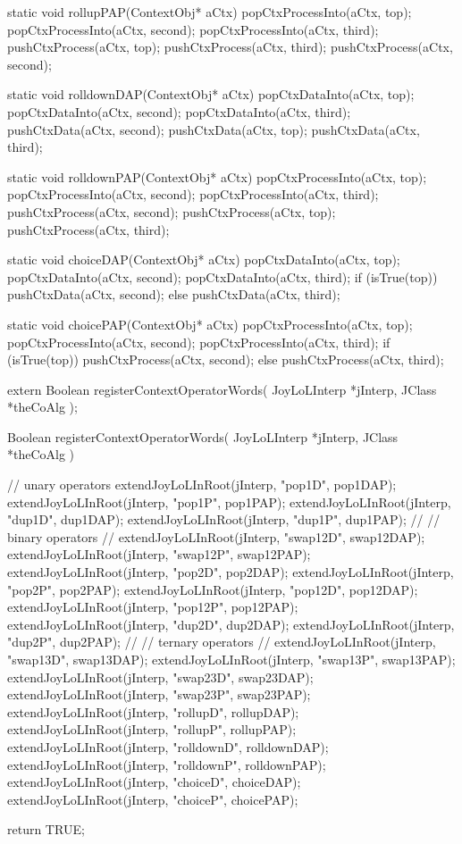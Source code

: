\startCCode
static void rollupPAP(ContextObj* aCtx) {
  popCtxProcessInto(aCtx, top);
  popCtxProcessInto(aCtx, second);
  popCtxProcessInto(aCtx, third);
  pushCtxProcess(aCtx, top);
  pushCtxProcess(aCtx, third);
  pushCtxProcess(aCtx, second);
}
\stopCCode

\startCCode
static void rolldownDAP(ContextObj* aCtx) {
  popCtxDataInto(aCtx, top);
  popCtxDataInto(aCtx, second);
  popCtxDataInto(aCtx, third);
  pushCtxData(aCtx, second);
  pushCtxData(aCtx, top);
  pushCtxData(aCtx, third);
}
\stopCCode

\startCCode
static void rolldownPAP(ContextObj* aCtx) {
  popCtxProcessInto(aCtx, top);
  popCtxProcessInto(aCtx, second);
  popCtxProcessInto(aCtx, third);
  pushCtxProcess(aCtx, second);
  pushCtxProcess(aCtx, top);
  pushCtxProcess(aCtx, third);
}
\stopCCode

\startCCode
static void choiceDAP(ContextObj* aCtx) {
  popCtxDataInto(aCtx, top);
  popCtxDataInto(aCtx, second);
  popCtxDataInto(aCtx, third);
  if (isTrue(top)) {
    pushCtxData(aCtx, second);
  } else {
    pushCtxData(aCtx, third);
  }
}
\stopCCode

\startCCode
static void choicePAP(ContextObj* aCtx) {
  popCtxProcessInto(aCtx, top);
  popCtxProcessInto(aCtx, second);
  popCtxProcessInto(aCtx, third);
  if (isTrue(top)) {
    pushCtxProcess(aCtx, second);
  } else {
    pushCtxProcess(aCtx, third);
  }
}
\stopCCode


\startCHeader
extern Boolean registerContextOperatorWords(
  JoyLoLInterp *jInterp,
  JClass       *theCoAlg
);
\stopCHeader
{}

\startCCode
Boolean registerContextOperatorWords(
  JoyLoLInterp *jInterp,
  JClass       *theCoAlg
) {
  // unary operators
  extendJoyLoLInRoot(jInterp, "pop1D", pop1DAP);
  extendJoyLoLInRoot(jInterp, "pop1P", pop1PAP);
  extendJoyLoLInRoot(jInterp, "dup1D", dup1DAP);
  extendJoyLoLInRoot(jInterp, "dup1P", dup1PAP);
  //
  // binary operators
  //
  extendJoyLoLInRoot(jInterp, "swap12D", swap12DAP);
  extendJoyLoLInRoot(jInterp, "swap12P", swap12PAP);
  extendJoyLoLInRoot(jInterp, "pop2D",   pop2DAP);
  extendJoyLoLInRoot(jInterp, "pop2P",   pop2PAP);
  extendJoyLoLInRoot(jInterp, "pop12D",  pop12DAP);
  extendJoyLoLInRoot(jInterp, "pop12P",  pop12PAP);
  extendJoyLoLInRoot(jInterp, "dup2D",   dup2DAP);
  extendJoyLoLInRoot(jInterp, "dup2P",   dup2PAP);
  //
  // ternary operators
  //
  extendJoyLoLInRoot(jInterp, "swap13D",   swap13DAP);
  extendJoyLoLInRoot(jInterp, "swap13P",   swap13PAP);
  extendJoyLoLInRoot(jInterp, "swap23D",   swap23DAP);
  extendJoyLoLInRoot(jInterp, "swap23P",   swap23PAP);
  extendJoyLoLInRoot(jInterp, "rollupD",   rollupDAP);
  extendJoyLoLInRoot(jInterp, "rollupP",   rollupPAP);
  extendJoyLoLInRoot(jInterp, "rolldownD", rolldownDAP);
  extendJoyLoLInRoot(jInterp, "rolldownP", rolldownPAP);
  extendJoyLoLInRoot(jInterp, "choiceD",   choiceDAP);
  extendJoyLoLInRoot(jInterp, "choiceP",   choicePAP);
  
  return TRUE;
}
\stopCCode
